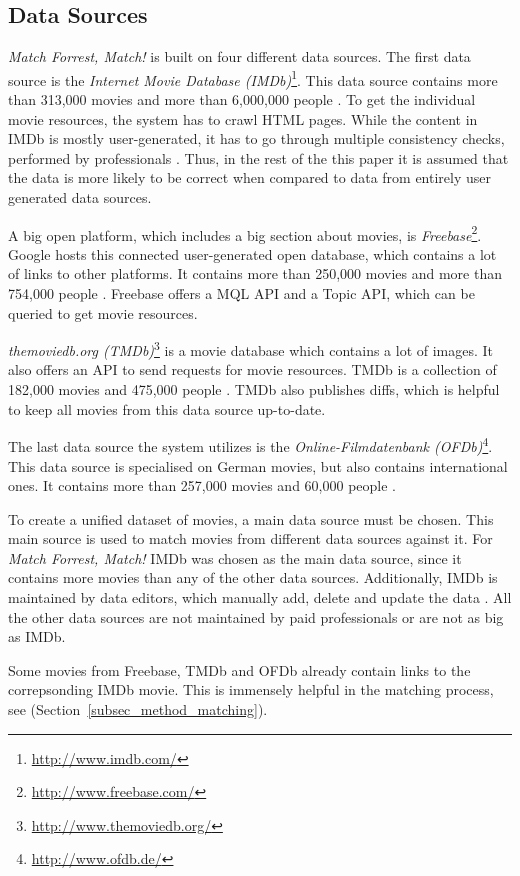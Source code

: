 \subsection{Data Sources}
\label{subsec_method_datasources}

\emph{Match Forrest, Match!} is built on four different data sources.
The first data source is the \textit{Internet Movie Database (IMDb)}\footnote{\url{http://www.imdb.com/}}.
This data source contains more than 313,000 movies and more than 6,000,000 people \cite{IMDb_stats}.
To get the individual movie resources, the system has to crawl HTML pages.
While the content in IMDb is mostly user-generated, it has to go through multiple consistency checks, performed by professionals \cite{IMDb_DataCreation, IMDb_amazon}.
Thus, in the rest of the this paper it is assumed that the data is more likely to be correct when compared to data from entirely user generated data sources.

A big open platform, which includes a big section about movies, is \textit{Freebase}\footnote{\url{http://www.freebase.com/}}.
Google hosts this connected user-generated open database, which contains a lot of links to other platforms.
It contains more than 250,000 movies and more than 754,000 people \cite{Freebase_stats}.
Freebase offers a MQL API and a Topic API, which can be queried to get movie resources.

\textit{themoviedb.org (TMDb)}\footnote{\url{http://www.themoviedb.org/}} is a movie database which contains a lot of images.
It also offers an API to send requests for movie resources.
TMDb is a collection of 182,000 movies and 475,000 people \cite{TMDb_stats}.
TMDb also publishes diffs, which is helpful to keep all movies from this data source up-to-date.

The last data source the system utilizes is the \textit{Online-Filmdatenbank (OFDb)}\footnote{\url{http://www.ofdb.de/}}.
This data source is specialised on German movies, but also contains international ones.
It contains more than 257,000 movies and 60,000 people \cite{OFDb_stats}.

To create a unified dataset of movies, a main data source must be chosen.
This main source is used to match movies from different data sources against it.
For \emph{Match Forrest, Match!} IMDb was chosen as the main data source, since it contains more movies than any of the other data sources.
Additionally, IMDb is maintained by data editors, which manually add, delete and update the data \cite{IMDb_DataCreation, IMDb_amazon}.
All the other data sources are not maintained by paid professionals or are not as big as IMDb.

Some movies from Freebase, TMDb and OFDb already contain links to the correpsonding IMDb movie.
This is immensely helpful in the matching process, see (Section~\ref{subsec_method_matching}).